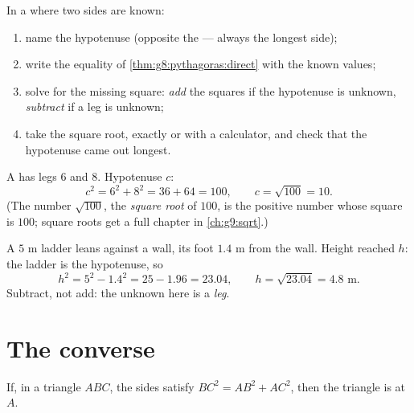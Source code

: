 \begin{method}\label{met:g8:pythagoras:compute}
In a  where two sides are known:
\begin{enumerate}
  \item name the hypotenuse (opposite the  --- always the
        longest side);
  \item write the equality of \cref{thm:g8:pythagoras:direct} with
        the known values;
  \item solve for the missing square: \emph{add} the squares if the
        hypotenuse is unknown, \emph{subtract} if a leg is unknown;
  \item take the square root, exactly or with a calculator, and check
        that the hypotenuse came out longest.
\end{enumerate}
\end{method}

\begin{example}\label{ex:g8:pythagoras:hypotenuse}
A  has legs $6$ and $8$. Hypotenuse $c$:
\[
c^2 = 6^2 + 8^2 = 36 + 64 = 100,
\qquad
c = \sqrt{100} = 10 .
\]
(The number $\sqrt{100}$, the \emph{square root} of $100$, is the
positive number whose square is $100$; square roots get a full
chapter in \cref{ch:g9:sqrt}.)
\end{example}

\begin{example}\label{ex:g8:pythagoras:leg}
A $5$ m ladder leans against a wall, its foot $1.4$ m from the wall.
Height reached $h$: the ladder is the hypotenuse, so
\[
h^2 = 5^2 - 1.4^2 = 25 - 1.96 = 23.04,
\qquad
h = \sqrt{23.04} = 4.8 \text{ m}.
\]
Subtract, not add: the unknown here is a \emph{leg}.
\end{example}

\section{The converse}

\begin{theorem}\label{thm:g8:pythagoras:converse}
If, in a triangle $ABC$, the sides satisfy $BC^2 = AB^2 + AC^2$, then
the triangle is  at $A$.
\end{theorem}
\admitted

